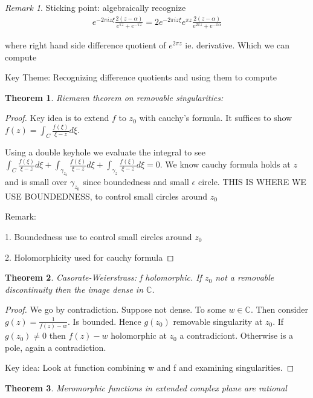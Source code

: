 \documentclass[11pt]{article}
\newcommand{\C}{\mathbb{C}}
\newtheorem{theorem}{Theorem}
\theoremstyle{remark}
\newtheorem{remark}{Remark}
\begin{document}
\begin{remark}
Sticking point: algebraically recognize
\begin{align*}
	e^{-2\pi i z \xi} \frac{2(z-\alpha)}{e^{\pi z}+e^{-\pi z}} = 2e^{-2\pi i z \xi} e^{\pi z}\frac{2(z-\alpha)}{e^{2\pi z}+e^{-\pi \alpha}}
\end{align*}

where right hand side difference quotient of $e^{2\pi z}$ ie. derivative. Which we can compute

Key Theme: Recognizing difference quotients and using them to compute
	
\end{remark}

\begin{theorem}
	Riemann theorem on removable singularities:
\end{theorem}

\begin{proof}
	Key idea is to extend $f$ to $z_0$ with cauchy's formula. It suffices to show $f(z) = \int_C \frac{f(\xi)}{\xi -z} d\xi$. 

	Using a double keyhole we evaluate the integral to see $\int_C \frac{f(\xi)}{\xi - z}d\xi + \int_{\gamma_{z_0}} \frac{f(\xi)}{\xi - z}d \xi + \int_{\gamma_{z}} \frac{f(\xi)}{\xi - z}d \xi = 0$. We know cauchy formula holds at $z$ and is small over $\gamma_{z_0}$ since boundedness and small $\epsilon$ circle. THIS IS WHERE WE USE BOUNDEDNESS, to control small circles around $z_0$

	Remark:

	1. Boundedness use to control small circles around $z_0$

	2. Holomorphicity used for cauchy formula
\end{proof}

\begin{theorem}
	Casorate-Weierstrass: f holomorphic. If $z_0$ not a removable discontinuity then the image dense in $\C$. 
\end{theorem}

\begin{proof}
	We go by contradiction. Suppose not dense. To some $w \in \C$. Then consider $g(z) = \frac{1}{f(z) - w}$. Is bounded. Hence $g(z_0)$ removable singularity at $z_0$. If $g(z_0) \neq 0$ then $f(z) - w$ holomorphic at $z_0$ a contradiciont. Otherwise is a pole, again a contradiction. 

	Key idea: Look at function combining w and f and examining singularities. 
\end{proof}

\begin{theorem}
	Meromorphic functions in extended complex plane are rational
\end{theorem}
\end{document}
